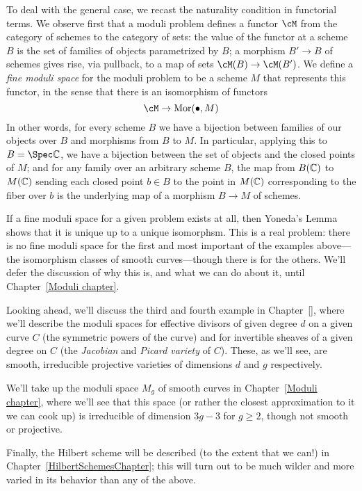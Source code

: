 To deal with the general case, we recast the naturality condition in functorial terms. We observe first that a moduli problem defines a functor $\cM$ from the category of schemes to the category of sets: the value of the functor at a scheme $B$ is the set of families of objects parametrized by $B$; a morphism $B' \to B$ of schemes gives rise, via pullback, to a map of sets $\cM(B) \to \cM(B')$. We define a \emph{fine moduli space} for the moduli problem to be a scheme $M$ that represents this functor, in the sense that there is an isomorphism of functors
$$
\cM \to {\rm Mor}(\bullet, M)
$$
In other words, for every scheme $B$ we have a bijection between families of our objects over $B$ and morphisms from $B$ to $M$. In particular, applying this to $B = \Spec \CC$, we have a bijection between the set of objects and the closed points of $M$; and for any family over an arbitrary scheme $B$, the map from $B(\CC)$ to $M(\CC)$ sending each closed point  $b \in B$ to the point in $M(\CC)$ corresponding to the fiber over $b$ is the underlying map of a morphism $B \to M$ of schemes.

If a fine moduli space for a given problem exists at all, then Yoneda's Lemma shows that it is unique up to a unique isomorphsm. This is a real problem: there is no fine moduli space for the first and most important of the examples above---the isomorphism classes of smooth curves---though there is for the others. We'll defer the discussion of why this is, and what we can do about it, until Chapter~\ref{Moduli chapter}.

Looking ahead, we'll discuss the third and fourth example in Chapter~\ref{}, where we'll describe the moduli spaces for effective divisors of given degree $d$ on a given curve $C$ (the symmetric powers of the curve) and for invertible sheaves of a given degree on $C$ (the \emph{Jacobian} and \emph{Picard variety} of $C$). These, as we'll see, are smooth, irreducible projective varieties of dimensions $d$ and $g$ respectively.

We'll take up the moduli space $M_g$ of smooth curves in Chapter~\ref{Moduli chapter}, where we'll see that this space (or rather the closest approximation to it we can cook up) is irreducible of dimension $3g-3$ for $g \geq 2$, though not smooth or projective.

Finally, the Hilbert scheme will be described (to the extent that we can!) in Chapter~\ref{HilbertSchemesChapter}; this will turn out to be much wilder and more varied in its behavior than any of the above.




